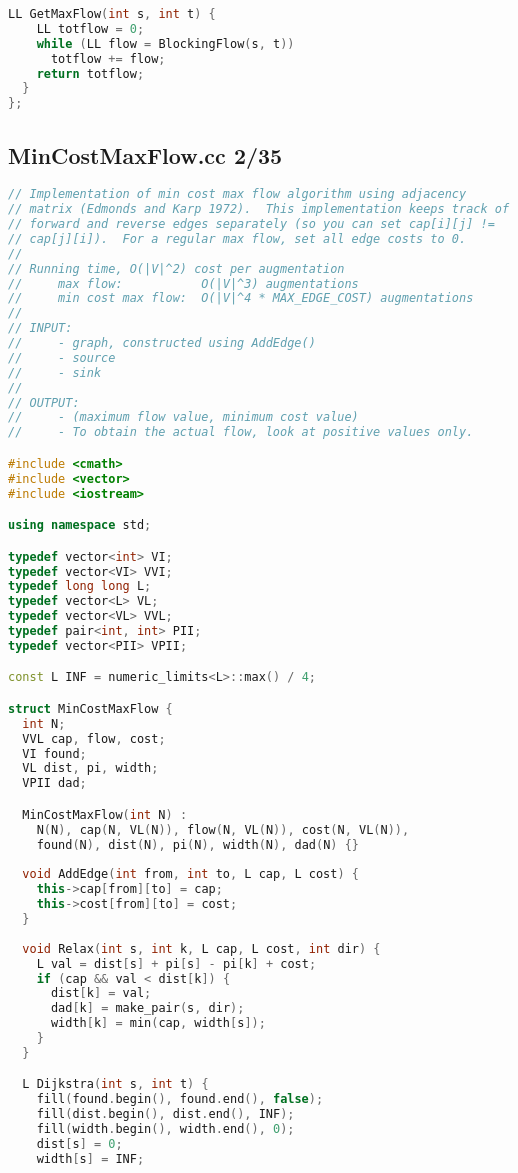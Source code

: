 \begin{lstlisting}[language=C++]
  LL GetMaxFlow(int s, int t) {
    LL totflow = 0;
    while (LL flow = BlockingFlow(s, t))
      totflow += flow;
    return totflow;
  }
};

\end{lstlisting}
\subsection{MinCostMaxFlow.cc 2/35}
\begin{lstlisting}[language=C++]
// Implementation of min cost max flow algorithm using adjacency
// matrix (Edmonds and Karp 1972).  This implementation keeps track of
// forward and reverse edges separately (so you can set cap[i][j] !=
// cap[j][i]).  For a regular max flow, set all edge costs to 0.
//
// Running time, O(|V|^2) cost per augmentation
//     max flow:           O(|V|^3) augmentations
//     min cost max flow:  O(|V|^4 * MAX_EDGE_COST) augmentations
//     
// INPUT: 
//     - graph, constructed using AddEdge()
//     - source
//     - sink
//
// OUTPUT:
//     - (maximum flow value, minimum cost value)
//     - To obtain the actual flow, look at positive values only.

#include <cmath>
#include <vector>
#include <iostream>

using namespace std;

typedef vector<int> VI;
typedef vector<VI> VVI;
typedef long long L;
typedef vector<L> VL;
typedef vector<VL> VVL;
typedef pair<int, int> PII;
typedef vector<PII> VPII;

const L INF = numeric_limits<L>::max() / 4;

struct MinCostMaxFlow {
  int N;
  VVL cap, flow, cost;
  VI found;
  VL dist, pi, width;
  VPII dad;

  MinCostMaxFlow(int N) : 
    N(N), cap(N, VL(N)), flow(N, VL(N)), cost(N, VL(N)), 
    found(N), dist(N), pi(N), width(N), dad(N) {}
  
  void AddEdge(int from, int to, L cap, L cost) {
    this->cap[from][to] = cap;
    this->cost[from][to] = cost;
  }
  
  void Relax(int s, int k, L cap, L cost, int dir) {
    L val = dist[s] + pi[s] - pi[k] + cost;
    if (cap && val < dist[k]) {
      dist[k] = val;
      dad[k] = make_pair(s, dir);
      width[k] = min(cap, width[s]);
    }
  }

  L Dijkstra(int s, int t) {
    fill(found.begin(), found.end(), false);
    fill(dist.begin(), dist.end(), INF);
    fill(width.begin(), width.end(), 0);
    dist[s] = 0;
    width[s] = INF;
    

\end{lstlisting}
